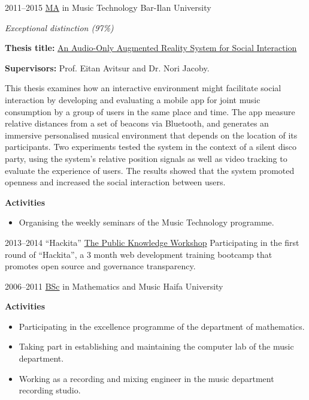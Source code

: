 \documentclass[]{friggeri-cv}
\begin{document}
\begin{entrylist}

    \entry
    {2011--2015}
    {\href{http://www.tomgurion.me/pdfs/MA.pdf}{MA} in Music Technology}
    {Bar-Ilan University}
    {
      \textit{Exceptional distinction (97\%)}

      \textbf{Thesis title:} \href{http://www.tomgurion.me/pdfs/Gurion - An Audio-Only Augmented Reality System for Social Interaction.pdf}{An Audio-Only Augmented Reality System for Social Interaction}

      \textbf{Supervisors:} Prof. Eitan Avitsur and Dr. Nori Jacoby.

      This thesis examines how an interactive environment might facilitate social interaction by developing and evaluating a mobile app for joint music consumption by a group of users in the same place and time.
      The app measure relative distances from a set of beacons via Bluetooth, and generates an immersive personalised musical environment that depends on the location of its participants.
      Two experiments tested the system in the context of a silent disco party, using the system's relative position signals as well as video tracking to evaluate the experience of users.
      The results showed that the system promoted openness and increased the social interaction between users.

      \textbf{Activities}
      \begin{itemize}
        \item
          Organising the weekly seminars of the Music Technology programme.
      \end{itemize}
    }

\end{entrylist}
\begin{entrylist}

    \entry
    {2013--2014}
    {“Hackita”}
    {\href{https://www.hasadna.org.il/en/}{The Public Knowledge Workshop}}
    {Participating in the first round of ``Hackita'', a 3 month web development training bootcamp that promotes open source and governance transparency.}

\end{entrylist}
\begin{entrylist}

    \entry
    {2006--2011}
    {\href{http://www.tomgurion.me/pdfs/BSc.pdf}{BSc} in Mathematics and Music}
    {Haifa University}
    {
      \textbf{Activities}
      \begin{itemize}
        \item
          Participating in the excellence programme of the department of mathematics.
        \item
          Taking part in establishing and maintaining the computer lab of the music department.
        \item
          Working as a recording and mixing engineer in the music department recording studio.
      \end{itemize}
    }

\end{entrylist}
\end{document}
